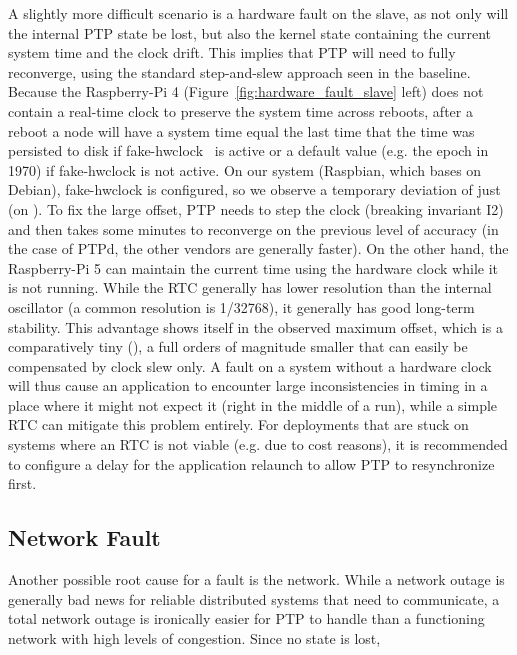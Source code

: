 A slightly more difficult scenario is a hardware fault on the slave, as not only will the internal PTP state be lost, but also the kernel state containing the current system time and the clock drift. This implies that PTP will need to fully reconverge, using the standard step-and-slew approach seen in the baseline. Because the Raspberry-Pi 4 (Figure~\ref{fig:hardware_fault_slave} left) does not contain a real-time clock to preserve the system time across reboots, after a reboot a node will have a system time equal the last time that the time was persisted to disk if fake-hwclock~\cite{fake-hwclock-manpage} is active or a default value (e.g. the epoch in 1970) if fake-hwclock is not active. On our system (Raspbian, which bases on Debian), fake-hwclock is configured, so we observe a temporary deviation of just \fTimeMin{\cmpMax} (on \fVendor{\cmpMaxArg}). To fix the large offset, PTP needs to step the clock (breaking invariant I2) and then takes some minutes to reconverge on the previous level of accuracy (in the case of PTPd, the other vendors are generally faster). On the other hand, the Raspberry-Pi 5 can maintain the current time using the hardware clock while it is not running. While the RTC generally has lower resolution than the internal oscillator (a common resolution is 1/32768), it generally has good long-term stability. This advantage shows itself in the observed maximum offset, which is a comparatively tiny \fTime{\cmpMax} (\fVendor{\cmpMaxArg}), a full  orders of magnitude smaller that can easily be compensated by clock slew only. A fault on a system without a hardware clock will thus cause an application to encounter large inconsistencies in timing in a place where it might not expect it (right in the middle of a run), while a simple RTC can mitigate this problem entirely. For deployments that are stuck on systems where an RTC is not viable (e.g. due to cost reasons), it is recommended to configure a delay for the application relaunch to allow PTP to resynchronize first.


\subsection{Network Fault}

Another possible root cause for a fault is the network. While a network outage is generally bad news for reliable distributed systems that need to communicate, a total network outage is ironically easier for PTP to handle than a functioning network with high levels of congestion. Since no state is lost,